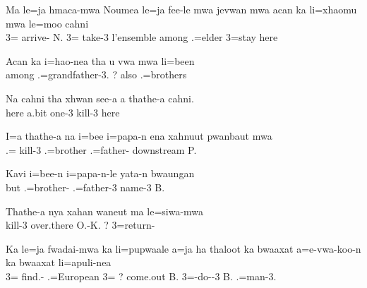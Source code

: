 \ea
\gll Ma le=ja hmaca-mwa Noumea le=ja fee-le mwa jevwan mwa acan ka li=xhaomu mwa le=moo cahni \\  3= arrive- N. 3= take-3  l'ensemble  among  .=elder  3=stay here\\ \glt {}
\z 

\ea
\gll Acan ka i=hao-nea tha u vwa mwa li=been\\ among  .=grandfather-3.  ?  also .=brothers\\ \glt {}
\z 

\ea
\gll Na cahni tha xhwan see-a a thathe-a cahni. \\  here  a.bit one-3  kill-3 here\\ \glt {}
\z 

\ea
\gll I=a thathe-a na i=bee i=papa-n ena xahnuut pwanbaut mwa\\  .= kill-3  .=brother .=father-  downstream P. \\ \glt {}
\z

\ea
\gll Kavi i=bee-n i=papa-n-le yata-n bwaungan\\ 
but .=brother- .=father-3 name-3 B.\\ 
\glt {}
\z 

\ea
\gll Thathe-a nya xahan waneut ma le=siwa-mwa \\ 
kill-3  over.there O.-K. ? 3=return-  \\ 
\glt {}
\z


\ea
\gll Ka le=ja fwadai-mwa ka li=pupwaale a=ja ha thaloot ka bwaaxat a=e-vwa-koo-n ka bwaaxat li=apuli-nea\\  3= find.-  .=European 3= ? come.out  B. 3=-do--3  B. .=man-3.
\\ \glt {}
\z

